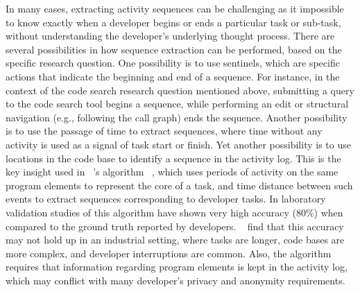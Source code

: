 In many cases, extracting activity sequences can be challenging as it impossible to know exactly when a developer begins or ends a particular task or sub-task, without understanding the developer's underlying thought process. There are several possibilities in how sequence extraction can be performed, based on the specific research question. One possibility is to use sentinels, which are specific actions that indicate the beginning and end of a sequence. For instance, in the context of the code search research question mentioned above, submitting a query to the code search tool begins a sequence, while performing an edit or structural navigation (e.g., following the call graph) ends the sequence. Another possibility is to use the passage of time to extract sequences, where time without any activity is used as a signal of task start or finish. Yet another possibility is to use locations in the code base to identify a sequence in the activity log. This is the key insight used in  ~'s algorithm ~\citeyear{Coman-TaskIdent}, which uses periods of activity on the same program elements to represent the core of a task, and time distance between such events to extract sequences corresponding to developer tasks. In laboratory validation studies of this algorithm have shown very high accuracy (80\%) when compared to the ground truth reported by developers. ~ find that this accuracy may not hold up in an industrial setting, where tasks are longer, code bases are more complex, and developer interruptions are common. Also, the algorithm requires that information regarding program elements is kept in the activity log, which may conflict with many developer's privacy and anonymity requirements.



